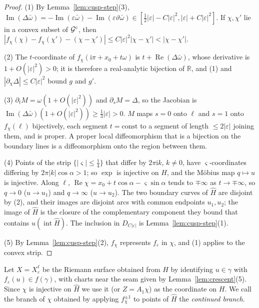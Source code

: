 \documentclass[11pt]{amsart}
\theoremstyle{definition}
\newcommand{\ii}{\mathrm{i}}
\begin{document}
\begin{proof}
(1) By Lemma~\ref{lem:cusp-step}(3),
$\operatorname{Im}(\Delta\bar\omega)=-\operatorname{Im}(\varepsilon\bar\omega)-\operatorname{Im}(\varepsilon\vartheta\bar\omega)
\in[\tfrac12|\varepsilon|-C|\varepsilon|^2,|\varepsilon|+C|\varepsilon|^2]$.  If $\chi,\chi'$ lie in a convex
subset of $\mathcal G^{\rm c}$, then
$|f_\chi(\chi)-f_\chi(\chi')-(\chi-\chi')|\le C|\varepsilon|^2|\chi-\chi'|<|\chi-\chi'|$.

(2) The $t$-coordinate of $f_\chi(\ii\pi+x_0+t\omega)$ is
$t+\operatorname{Re}(\Delta\bar\omega)$, whose derivative is $1+O(|\varepsilon|^2)>0$; it is
therefore a real-analytic bijection of $\mathbb R$, and (1) and
$|\partial_\chi\Delta|\le C|\varepsilon|^2$ bound $g$ and $g'$.

(3) $\partial_tM=\omega(1+O(|\varepsilon|^2))$ and $\partial_sM=\Delta$, so the Jacobian is
$\operatorname{Im}(\Delta\bar\omega)(1+O(|\varepsilon|^2))\ge\tfrac13|\varepsilon|>0$.  $M$ maps $s=0$ onto $\ell$ and
$s=1$ onto $f_\chi(\ell)$ bijectively, each segment $t=\mathrm{const}$ to a segment
of length $\le2|\varepsilon|$ joining them, and is proper.  A proper local
diffeomorphism that is a bijection on the boundary lines is a
diffeomorphism onto the region between them.

(4) Points of the strip $\{|\varsigma|\le\tfrac14\}$ that differ by
$2\pi\ii k$, $k\ne0$, have $\varsigma$-coordinates differing by
$2\pi|k|\cos\alpha>1$; so $\exp$ is injective on $\hat H$, and the Möbius map
$q\mapsto u$ is injective.  Along $\ell$,
$\operatorname{Re}\chi=x_0+t\cos\alpha-\varsigma\sin\alpha$ tends to $\mp\infty$ as $t\to\mp\infty$, so
$q\to0$ ($u\to u_1$) and $q\to\infty$ ($u\to u_2$).  The two boundary curves
of $\hat H$ are disjoint by (2), and their images are disjoint arcs with
common endpoints $u_1,u_2$; the image of $\hat H$ is the closure of the
complementary component they bound that contains $u(\operatorname{int}\hat H)$.
The inclusion in $D_{C|\varepsilon|}$ is Lemma~\ref{lem:cusp-step}(1).

(5) By Lemma~\ref{lem:cusp-step}(2), $f_\chi$ represents $f_\varepsilon$ in $\chi$, and (1)
applies to the convex strip.
\end{proof}

Let $X=X^\ell_\varepsilon$ be the Riemann surface obtained from $H$ by identifying
$u\in\gamma$ with $f_\varepsilon(u)\in f(\gamma)$, with charts near the seam given by
Lemma~\ref{lem:crescent}(5).  Since $\chi$ is injective on $\hat H$ we use it
(or $Z=A_1\chi$) as the coordinate on $H$.  We call the branch of $\chi$ obtained
by applying $f_\chi^{\pm1}$ to points of $\hat H$ the \emph{continued branch}.
\end{document}
